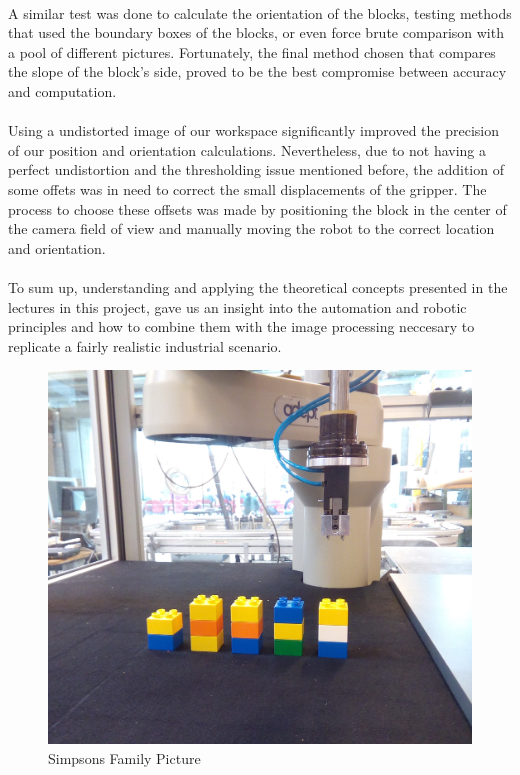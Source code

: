 \paragraph{} A similar test was done to calculate the orientation of the blocks, testing methods that used the boundary boxes of the blocks, or even force brute comparison with a pool of different pictures. Fortunately, the final method chosen that compares the slope of the block's side, proved to be the best compromise between accuracy and computation.

\paragraph{} Using a undistorted image of our workspace significantly improved the precision of our position and orientation calculations. Nevertheless, due to not having a perfect undistortion and the thresholding issue mentioned before, the addition of some offets was in need to correct the small displacements of the gripper. 
The process to choose these offsets was made by positioning the block in the center of the camera field of view and manually moving the robot to the correct location and orientation.

\paragraph{} To sum up, understanding and applying the theoretical concepts presented in the lectures in this project, gave us an insight into the automation and robotic principles and how to combine them with the image processing neccesary to replicate a fairly realistic industrial scenario.

\begin{figure}[H]
	\centering
	\includegraphics[scale=0.15]{figures/simpsons.jpg}
	\caption{Simpsons Family Picture}
\end{figure}